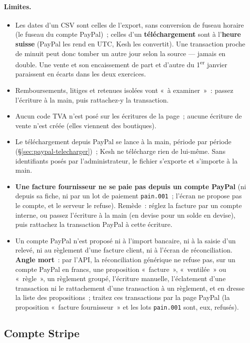 \documentclass[a4paper,11pt,oneside]{article}
\begin{document}
\paragraph{Limites.}
\begin{itemize}
    \item Les dates d'un CSV sont celles de l'export, sans conversion de fuseau horaire (le fuseau du compte PayPal)~; celles d'un \textbf{téléchargement} sont à l'\textbf{heure suisse} (PayPal les rend en UTC, Kesh les convertit). Une transaction proche de minuit peut donc tomber un autre jour selon la source --- jamais en double. Une vente et son encaissement de part et d'autre du 1\textsuperscript{er} janvier paraissent en écarts dans les deux exercices.
    \item Remboursements, litiges et retenues isolées vont «~à examiner~»~: passez l'écriture à la main, puis rattachez-y la transaction.
    \item Aucun code TVA n'est posé sur les écritures de la page~; aucune écriture de vente n'est créée (elles viennent des boutiques).
    \item Le téléchargement depuis PayPal se lance à la main, période par période (\S\ref{sec:paypal-telecharger})~; Kesh ne télécharge rien de lui-même. Sans identifiants posés par l'administrateur, le fichier s'exporte et s'importe à la main.
    \item \textbf{Une facture fournisseur ne se paie pas depuis un compte PayPal} (ni depuis sa fiche, ni par un lot de paiement \texttt{pain.001}~; l'écran ne propose pas le compte, et le serveur le refuse). Remède~: réglez la facture par un compte interne, ou passez l'écriture à la main (en devise pour un solde en devise), puis rattachez la transaction PayPal à cette écriture.
    \item Un compte PayPal n'est proposé ni à l'import bancaire, ni à la saisie d'un relevé, ni au règlement d'une facture client, ni à l'écran de réconciliation. \textbf{Angle mort}~: par l'API, la réconciliation générique ne refuse pas, sur un compte PayPal en francs, une proposition «~facture~», «~ventilée~» ou «~règle~», un règlement groupé, l'écriture manuelle, l'éclatement d'une transaction ni le rattachement d'une transaction à un règlement, et en dresse la liste des propositions~; traitez ces transactions par la page PayPal (la proposition «~facture fournisseur~» et les lots \texttt{pain.001} sont, eux, refusés).
\end{itemize}

\subsection{Compte Stripe}\label{sec:compte-stripe}
\end{document}
